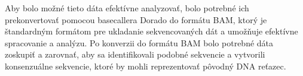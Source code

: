 Aby bolo možné tieto dáta efektívne analyzovať, bolo potrebné ich prekonvertovať pomocou basecallera Dorado do formátu BAM, ktorý je štandardným formátom pre ukladanie sekvencovaných dát a umožňuje efektívne spracovanie a analýzu.
Po konverzii do formátu BAM bolo potrebné dáta zoskupiť a zarovnať, aby sa identifikovali podobné sekvencie a vytvorili konsenzuálne sekvencie, ktoré by mohli reprezentovať pôvodný DNA reťazec.
